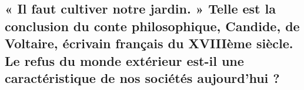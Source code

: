\newpage \begin{center}
	\subsection*{« Il faut cultiver notre jardin. » Telle est la conclusion du conte philosophique, Candide, de Voltaire, écrivain français du XVIIIème siècle. \newline Le refus du monde extérieur est-il une caractéristique de nos sociétés aujourd’hui ?}
\end{center}